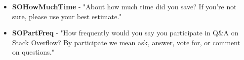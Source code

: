 \begin{appendices}
\begin{itemize}
        \item \textbf{SOHowMuchTime} - "About how much time did you save? If you're not sure, please use your best estimate."
        \item \textbf{SOPartFreq} - "How frequently would you say you participate in Q&A on Stack Overflow? By participate we mean ask, answer, vote for, or comment on questions."
    \end{itemize}
\end{appendices}
\thispagestyle{normal}
